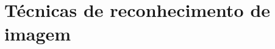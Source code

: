 \documentclass[12pt, %
openright, 
oneside, %
a4paper,    %
brazil]{facom-ufu-abntex2}
\begin{document}





\section{Técnicas de reconhecimento de imagem}
\end{document}
